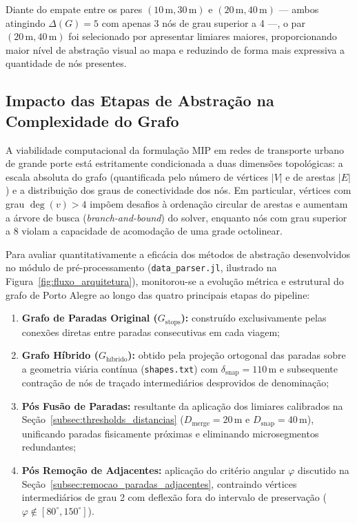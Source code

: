 \documentclass[cic,tc]{infufrgs}
\begin{document}
Diante do empate entre os pares $(10\,\text{m}, 30\,\text{m})$ e $(20\,\text{m}, 40\,\text{m})$ — ambos atingindo $\Delta(G) = 5$ com apenas 3 nós de grau superior a 4 —, o par $(20\,\text{m}, 40\,\text{m})$ foi selecionado por apresentar limiares maiores, proporcionando maior nível de abstração visual ao mapa e reduzindo de forma mais expressiva a quantidade de nós presentes.

\subsection{Impacto das Etapas de Abstração na Complexidade do Grafo}
\label{subsec:impacto_etapas_abstracao}

A viabilidade computacional da formulação MIP em redes de transporte urbano de grande porte está estritamente condicionada a duas dimensões topológicas: a escala absoluta do grafo (quantificada pelo número de vértices $|V|$ e de arestas $|E|$) e a distribuição dos graus de conectividade dos nós. Em particular, vértices com grau $\deg(v) > 4$ impõem desafios à ordenação circular de arestas e aumentam a árvore de busca (\textit{branch-and-bound}) do solver, enquanto nós com grau superior a 8 violam a capacidade de acomodação de uma grade octolinear.

Para avaliar quantitativamente a eficácia dos métodos de abstração desenvolvidos no módulo de pré-processamento (\texttt{data\_parser.jl}, ilustrado na Figura~\ref{fig:fluxo_arquitetura}), monitorou-se a evolução métrica e estrutural do grafo de Porto Alegre ao longo das quatro principais etapas do pipeline:

\begin{enumerate}
    \item \textbf{Grafo de Paradas Original ($G_{\text{stops}}$):} construído exclusivamente pelas conexões diretas entre paradas consecutivas em cada viagem;
    \item \textbf{Grafo Híbrido ($G_{\text{híbrido}}$):} obtido pela projeção ortogonal das paradas sobre a geometria viária contínua (\texttt{shapes.txt}) com $\delta_{\text{snap}} = 110\,\text{m}$ e subsequente contração de nós de traçado intermediários desprovidos de denominação;
    \item \textbf{Pós Fusão de Paradas:} resultante da aplicação dos limiares calibrados na Seção~\ref{subsec:thresholds_distancias} ($D_{\text{merge}} = 20\,\text{m}$ e $D_{\text{snap}} = 40\,\text{m}$), unificando paradas fisicamente próximas e eliminando microsegmentos redundantes;
    \item \textbf{Pós Remoção de Adjacentes:} aplicação do critério angular $\varphi$ discutido na Seção~\ref{subsec:remocao_paradas_adjacentes}, contraindo vértices intermediários de grau 2 com deflexão fora do intervalo de preservação ($\varphi \notin [80^\circ, 150^\circ]$).
\end{enumerate}
\end{document}
